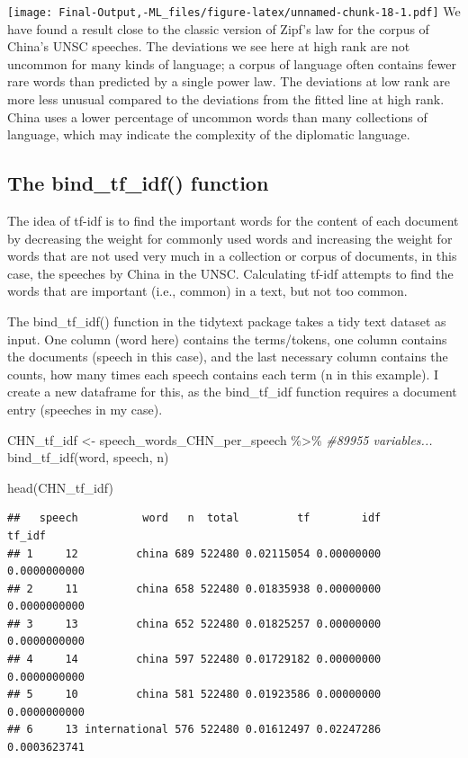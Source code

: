 \documentclass[
]{article}
\newenvironment{Shaded}{\begin{snugshade}}{\end{snugshade}}
\newcommand{\CommentTok}[1]{\textcolor[rgb]{0.56,0.35,0.01}{\textit{#1}}}
\newcommand{\FunctionTok}[1]{\textcolor[rgb]{0.00,0.00,0.00}{#1}}
\newcommand{\NormalTok}[1]{#1}
\newcommand{\OtherTok}[1]{\textcolor[rgb]{0.56,0.35,0.01}{#1}}
\newcommand{\SpecialCharTok}[1]{\textcolor[rgb]{0.00,0.00,0.00}{#1}}
\begin{document}
\texttt{[image: Final-Output,-ML\_files/figure-latex/unnamed-chunk-18-1.pdf]}
We have found a result close to the classic version of Zipf's law for
the corpus of China's UNSC speeches. The deviations we see here at high
rank are not uncommon for many kinds of language; a corpus of language
often contains fewer rare words than predicted by a single power law.
The deviations at low rank are more less unusual compared to the
deviations from the fitted line at high rank. China uses a lower
percentage of uncommon words than many collections of language, which
may indicate the complexity of the diplomatic language.

\hypertarget{the-bind_tf_idf-function}{%
\subsection{The bind\_tf\_idf()
function}\label{the-bind_tf_idf-function}}

The idea of tf-idf is to find the important words for the content of
each document by decreasing the weight for commonly used words and
increasing the weight for words that are not used very much in a
collection or corpus of documents, in this case, the speeches by China
in the UNSC. Calculating tf-idf attempts to find the words that are
important (i.e., common) in a text, but not too common.

The bind\_tf\_idf() function in the tidytext package takes a tidy text
dataset as input. One column (word here) contains the terms/tokens, one
column contains the documents (speech in this case), and the last
necessary column contains the counts, how many times each speech
contains each term (n in this example). I create a new dataframe for
this, as the bind\_tf\_idf function requires a document entry (speeches
in my case).

\begin{Shaded}
\begin{Highlighting}[]
\NormalTok{CHN\_tf\_idf }\OtherTok{\textless{}{-}}\NormalTok{ speech\_words\_CHN\_per\_speech }\SpecialCharTok{\%\textgreater{}\%}  \CommentTok{\#89955 variables...}
  \FunctionTok{bind\_tf\_idf}\NormalTok{(word, speech, n)}

\FunctionTok{head}\NormalTok{(CHN\_tf\_idf)}
\end{Highlighting}
\end{Shaded}

\begin{verbatim}
##   speech          word   n  total         tf        idf       tf_idf
## 1     12         china 689 522480 0.02115054 0.00000000 0.0000000000
## 2     11         china 658 522480 0.01835938 0.00000000 0.0000000000
## 3     13         china 652 522480 0.01825257 0.00000000 0.0000000000
## 4     14         china 597 522480 0.01729182 0.00000000 0.0000000000
## 5     10         china 581 522480 0.01923586 0.00000000 0.0000000000
## 6     13 international 576 522480 0.01612497 0.02247286 0.0003623741
\end{verbatim}
\end{document}
